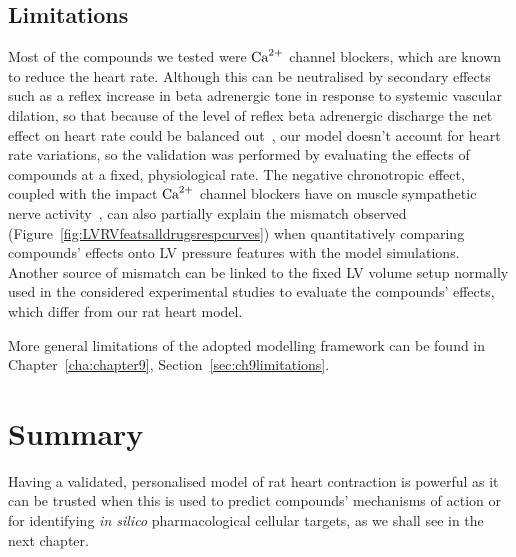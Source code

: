 \subsection{Limitations}\label{sec:ch6limitations}
Most of the compounds we tested were $\textrm{Ca}^{2+}$ channel blockers, which are known to reduce the heart rate. Although this can be neutralised by secondary effects such as a reflex increase in beta adrenergic tone in response to systemic vascular dilation, so that because of the level of reflex beta adrenergic discharge the net effect on heart rate could be balanced out~\cite{Low:1982}, our model doesn't account for heart rate variations, so the validation was performed by evaluating the effects of compounds at a fixed, physiological rate. The negative chronotropic effect, coupled with the impact $\textrm{Ca}^{2+}$ channel blockers have on muscle sympathetic nerve activity~\cite{Binggeli:2002}, can also partially explain the mismatch observed (Figure~\ref{fig:LVRVfeatsalldrugsrespcurves}) when quantitatively comparing compounds' effects onto LV pressure features with the model simulations. Another source of mismatch can be linked to the fixed LV volume setup normally used in the considered experimental studies to evaluate the compounds' effects, which differ from our rat heart model.

\vspace{0.2cm}
More general limitations of the adopted modelling framework can be found in Chapter~\ref{cha:chapter9}, Section~\ref{sec:ch9limitations}.


%
%
%
\section{Summary}\label{sec:ch6summary}
Having a validated, personalised model of rat heart contraction is powerful as it can be trusted when this is used to predict compounds' mechanisms of action or for identifying \textit{in silico} pharmacological cellular targets, as we shall see in the next chapter.